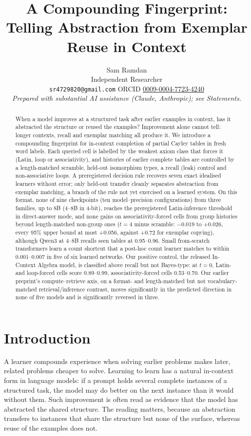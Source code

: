 \documentclass[11pt]{article}
\title{A Compounding Fingerprint: Telling Abstraction from Exemplar Reuse in Context}
\author{Sam Ramdan\\ {\small Independent Researcher}\\ {\small \texttt{sr4729820@gmail.com} \quad ORCID \href{https://orcid.org/0009-0004-7723-4240}{0009-0004-7723-4240}}\\[4pt] {\small\itshape Prepared with substantial AI assistance (Claude, Anthropic); see Statements.}}
\date{}
\begin{document}
\maketitle
\begin{abstract}
When a model improves at a structured task after earlier examples in context, has it abstracted the structure or reused the examples? Improvement alone cannot tell: longer contexts, recall and exemplar matching all produce it. We introduce a compounding fingerprint for in-context completion of partial Cayley tables in fresh word labels. Each queried cell is labelled by the weakest axiom class that forces it (Latin, loop or associativity), and histories of earlier complete tables are controlled by a length-matched scramble, held-out isomorphism types, a recall (leak) control and non-associative loops. A preregistered decision rule recovers seven exact idealised learners without error; only held-out transfer cleanly separates abstraction from exemplar matching, a branch of the rule not yet exercised on a learned system. On this format, none of nine checkpoints (ten model--precision configurations) from three families, up to 8B (4--8B in 4-bit), reaches the preregistered Latin-inference threshold in direct-answer mode, and none gains on associativity-forced cells from group histories beyond length-matched non-group ones ($t=4$ minus scramble: $-$0.019 to +0.026, every 95\% upper bound at most +0.056, against +0.72 for exemplar copying), although Qwen3 at 4--8B recalls seen tables at 0.95--0.96. Small from-scratch transformers learn a count shortcut that a post-hoc count learner matches to within 0.001--0.007 in five of six learned networks. Our positive control, the released In-Context Algebra model, is classified above recall but not Bayes-type: at $t=0$, Latin- and loop-forced cells score 0.89--0.99, associativity-forced cells 0.53--0.70. Our earlier preprint's compute--retrieve axis, on a format- and length-matched but not vocabulary-matched retrieval/inference contrast, moves significantly in the predicted direction in none of five models and is significantly reversed in three.
\end{abstract}
\section{Introduction}\label{sec:intro}

A learner compounds experience when solving earlier problems makes later, related problems cheaper to solve. Learning to learn has a natural in-context form in language models: if a prompt holds several complete instances of a structured task, the model may do better on the next instance than it would without them. Such improvement is often read as evidence that the model has abstracted the shared structure. The reading matters, because an abstraction transfers to instances that share the structure but none of the surface, whereas reuse of the examples does not.
\end{document}
